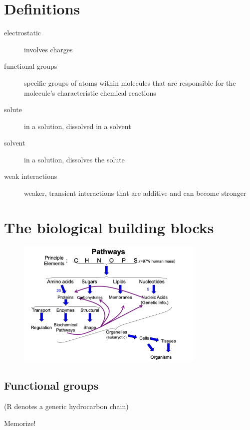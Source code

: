 \documentclass[a4paper, 12pt]{article}
\begin{document}
\newpage

\section*{Definitions}

\begin{description}
\item [electrostatic] involves charges
\item [functional groups] specific groups of atoms within molecules that are responsible for the molecule's characteristic chemical reactions
\item [solute] in a solution, dissolved in a solvent
\item [solvent] in a solution, dissolves the solute
\item [weak interactions] weaker, transient interactions that are additive and can become stronger
\end{description}

\newpage

\section*{The biological building blocks}

\begin{figure}[H]
\centering
\includegraphics[width=0.8\textwidth]{pathways}
\end{figure}

\subsection*{Functional groups}

(R denotes a generic hydrocarbon chain)

Memorize!
\end{document}
